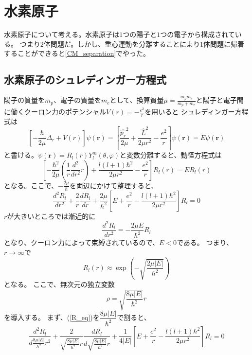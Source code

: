 \section{水素原子}
水素原子について考える。水素原子は$1$つの陽子と$1$つの電子から構成されている。
つまり$2$体問題だ。しかし、重心運動を分離することにより$1$体問題に帰着することができると\ref{CM_separation}でやった。
\subsection{水素原子のシュレディンガー方程式}
陽子の質量を$m_p$、電子の質量を$m_e$として、換算質量$\mu = \frac{m_p m_e}{m_p + m_e}$と陽子と電子間に働くクーロン力のポテンシャル$V(r) = -\frac{e^2}{r}$を用いると
シュレディンガー方程式は
\begin{equation}
	\left[ - \dfrac{\hbar}{2\mu}\Delta_r + V(r)\right]\psi(\bm{r})
	= \left[\dfrac{\hat{p_r}^2}{2\mu} + \dfrac{\hat{L}^2}{2\mu r^2} - \dfrac{e^2}{r}\right]\psi(\bm{r}) = E\psi(\bm{r})
\end{equation}
と書ける。$\psi(\bm{r}) = R_l(r)Y_l^m(\theta,\varphi)$と変数分離すると、動径方程式は
\begin{equation}
	\left[ -\dfrac{\hbar^2}{2\mu}\left(\dfrac{1}{r}\dfrac{d^2}{dr^2}r\right)  + \dfrac{l(l+1)\hbar^2}{2\mu r^2} - \dfrac{e^2}{r}\right]R_l(r) = ER_l(r)
\end{equation}
となる。ここで、$-\frac{2\mu}{\hbar}$を両辺にかけて整理すると、
\begin{equation}
	\label{R_eq}
	\dfrac{d^2 R_l}{dr^2} + \dfrac{2}{r}\dfrac{dR_l}{dr} + \dfrac{2\mu}{\hbar^2}\left[ E + \dfrac{e^2}{r} - \dfrac{l(l+1)\hbar^2}{2\mu r^2} \right]R_l = 0
\end{equation}
$r$が大きいところでは漸近的に
\begin{equation}
	\dfrac{d^2 R_l}{dr^2} = - \dfrac{2\mu E}{\hbar^2}R_l
\end{equation}
となり、クーロン力によって束縛されているので、$E < 0$である。
つまり、$r \to \infty$で
\begin{equation}
	R_l(r) \approx \exp\left(- \sqrt{\dfrac{2\mu |E|}{\hbar^2}}\right)
\end{equation}
となる。
ここで、無次元の独立変数
\begin{equation}
	\rho = \sqrt{\dfrac{8\mu|E|}{\hbar^2}}r
\end{equation}
を導入する。
まず、(\ref{R_eq})を$\dfrac{8\mu|E|}{\hbar^2}$で割ると、
\begin{equation}
	\dfrac{d^2 R_l}{d \frac{8\mu|E|}{\hbar^2} r^2} + \dfrac{2}{\sqrt{\frac{8\mu|E|}{\hbar^2}}r}\dfrac{dR_l}{d\sqrt{\frac{8\mu|E|}{\hbar^2}}r}
	 + \dfrac{1}{4|E|}\left[ E + \dfrac{e^2}{r} - \dfrac{l(l+1)\hbar^2}{2\mu r^2} \right]R_l = 0
\end{equation}
